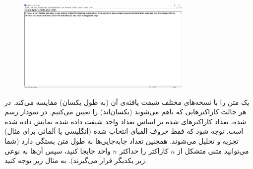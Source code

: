 \documentclass{article}
\begin{document}
\begin{figure}[H]
    \centering
    \includegraphics[width=0.75\textwidth]{figures/4e.jpg}
    \caption
	{}
    \label{fig:fig1}
\end{figure}
 یک متن را با نسخه‌های مختلف شیفت یافته‌ی آن (به طول یکسان) مقایسه می‌کند. در هر حالت کاراکترهایی که باهم  می‌شوند (یکسان‌اند) را تعیین می‌کنیم. در نمودار رسم شده، تعداد کاراکترهای شده بر اساس تعداد واحد شیفت داده شده نمایش داده شده است. توجه شود که فقط حروف الفبای انتخاب شده (انگلیسی یا آلمانی برای مثال) تجزیه و تحلیل می‌شوند. همچنین تعداد جابه‌جایی‌ها به طول متن بستگی دارد (شما می‌توانید متنی متشکل از $n$ کاراکتر را حداکثر $n$ واحد جابجا کنید، سپس آن‌ها به نوعی زیر یکدیگر قرار می‌گیرند). به مثال زیر توجه کنید.
\end{document}
